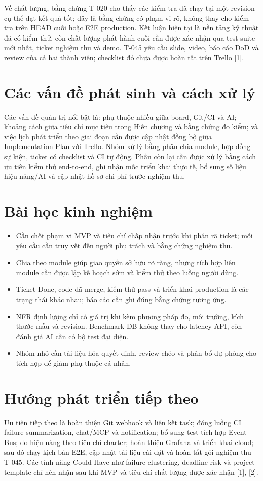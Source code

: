 \documentclass[12pt,a4paper]{report}
\begin{document}
Về chất lượng, bằng chứng T-020 cho thấy các kiểm tra đã chạy tại một revision cụ thể đạt kết quả tốt; đây là bằng chứng có phạm vi rõ, không thay cho kiểm tra trên HEAD cuối hoặc E2E production. Kết luận hiện tại là nền tảng kỹ thuật đã có kiểm thử, còn chất lượng phát hành cuối cần được xác nhận qua test suite mới nhất, ticket nghiệm thu và demo. T-045 yêu cầu slide, video, báo cáo DoD và review của cả hai thành viên; checklist đó chưa được hoàn tất trên Trello [1].

\section{Các vấn đề phát sinh và cách xử lý}
Các vấn đề quản trị nổi bật là: phụ thuộc nhiều giữa board, Git/CI và AI; khoảng cách giữa tiêu chí mục tiêu trong Hiến chương và bằng chứng đo kiểm; và việc lịch phát triển theo giai đoạn cần được cập nhật đồng bộ giữa Implementation Plan với Trello. Nhóm xử lý bằng phân chia module, hợp đồng sự kiện, ticket có checklist và CI tự động. Phần còn lại cần được xử lý bằng cách ưu tiên kiểm thử end-to-end, ghi nhận mốc triển khai thực tế, bổ sung số liệu hiệu năng/AI và cập nhật hồ sơ chi phí trước nghiệm thu.

\section{Bài học kinh nghiệm}
\begin{itemize}
    \item Cần chốt phạm vi MVP và tiêu chí chấp nhận trước khi phân rã ticket; mỗi yêu cầu cần truy vết đến người phụ trách và bằng chứng nghiệm thu.
    \item Chia theo module giúp giao quyền sở hữu rõ ràng, nhưng tích hợp liên module cần được lập kế hoạch sớm và kiểm thử theo luồng người dùng.
    \item Ticket Done, code đã merge, kiểm thử pass và triển khai production là các trạng thái khác nhau; báo cáo cần ghi đúng bằng chứng tương ứng.
    \item NFR định lượng chỉ có giá trị khi kèm phương pháp đo, môi trường, kích thước mẫu và revision. Benchmark DB không thay cho latency API, còn đánh giá AI cần có bộ test đại diện.
    \item Nhóm nhỏ cần tài liệu hóa quyết định, review chéo và phân bổ dự phòng cho tích hợp để giảm phụ thuộc cá nhân.
\end{itemize}

\section{Hướng phát triển tiếp theo}
Ưu tiên tiếp theo là hoàn thiện Git webhook và liên kết task; đóng luồng CI failure summarization, chat/MCP và notification; bổ sung test tích hợp Event Bus; đo hiệu năng theo tiêu chí charter; hoàn thiện Grafana và triển khai cloud; sau đó chạy kịch bản E2E, cập nhật tài liệu cài đặt và hoàn tất gói nghiệm thu T-045. Các tính năng Could-Have như failure clustering, deadline risk và project template chỉ nên nhận sau khi MVP và tiêu chí chất lượng được xác nhận [1], [2].
\end{document}
